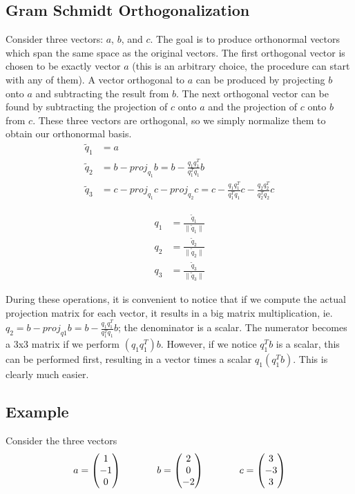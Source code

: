 \documentclass[12pt]{article}
\begin{document}
\begin{itemize}
\section{Gram Schmidt Orthogonalization}
Consider three vectors: $a$, $b$, and $c$. The goal is to produce orthonormal vectors which span the same space as the original vectors. The first orthogonal vector is chosen to be exactly vector $a$ (this is an arbitrary choice, the procedure can start with any of them). A vector orthogonal to $a$ can be produced by projecting $b$ onto $a$ and subtracting the result from $b$.  The next orthogonal vector can be found by subtracting the projection of $c$ onto $a$ and the projection of $c$ onto $b$ from $c$.  These three vectors are orthogonal, so we simply normalize them to obtain our orthonormal basis.
\begin{align*}
\tilde{q}_1 &= a \\
\tilde{q}_2 &= b - proj_{q_1}b = b-\frac{q_1q_1^T}{q_1^Tq_1}b \\
\tilde{q}_3 &= c - proj_{q_1}c - proj_{q_2}c = c - \frac{q_1q_1^T}{q_1^Tq_1}c - \frac{q_2q_2^T}{q_2^Tq_2} c
\end{align*}

\begin{align*}
q_1 &= \frac{\tilde{q}_1}{\|\tilde{q}_1\|}\\
q_2 &= \frac{\tilde{q}_2}{\|\tilde{q}_2\|}\\
q_3 &= \frac{\tilde{q}_3}{\|\tilde{q}_3\|}
\end{align*}

During these operations, it is convenient to notice that if we compute the actual projection matrix for each vector, it results in a big matrix multiplication, ie. $q_2 = b - proj_{q1}b = b - \frac{q_1 q_1^T}{q_1^T q_1} b$; the denominator is a scalar.  The numerator becomes a 3x3 matrix if we perform $(q_1 q_1^T)b$. However, if we notice $q_1^T b$ is a scalar, this can be performed first, resulting in a vector times a scalar $q_1 (q_1^T b)$. This is clearly much easier.

\subsection{Example}
Consider the three vectors
\begin{equation*}
a = \begin{pmatrix}1\\-1\\0\end{pmatrix} \hspace{.5in}
b = \begin{pmatrix}2\\0\\-2\end{pmatrix} \hspace{.5in}
c = \begin{pmatrix}3\\-3\\3\end{pmatrix}
\end{equation*}


\end{itemize}
\end{document}
